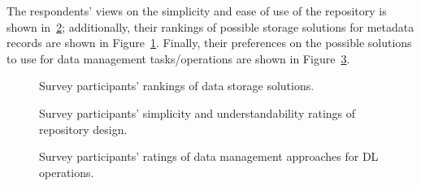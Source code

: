 The respondents' views on the simplicity and ease of use of the repository is shown in~\ref{fig:experimentation:survey:simplicity-understandability}; additionally, their rankings of possible storage solutions for metadata records are shown in Figure~\ref{fig:experimentation:survey:storage-solutions-ranking}. Finally, their preferences on the possible solutions to use for data management tasks/operations are shown in Figure~\ref{fig:experimentation:survey:data-management-operations}.

%
%

\begin{figure}
 \centering
 \framebox[\textwidth]{
 
 }
 \caption[Survey participants' rankings of storage solutions]{Survey participants' rankings of data storage solutions.}
 \label{fig:experimentation:survey:storage-solutions-ranking}
\end{figure}


\begin{figure}
 \centering
 \framebox[\textwidth]{
 
 }
 \caption[Survey participants' simplicity\& understandability ratings]{Survey participants' simplicity and understandability ratings of repository design.}
 \label{fig:experimentation:survey:simplicity-understandability}
\end{figure}

\begin{figure}
 \centering
 \framebox[\textwidth]{
 
 }
 \caption[Survey participants' ratings of data management approaches]{Survey participants' ratings of data management approaches for DL operations.}
 \label{fig:experimentation:survey:data-management-operations}
\end{figure}

